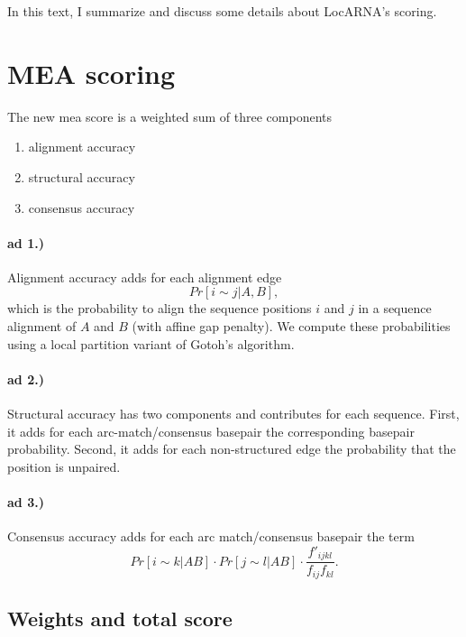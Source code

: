 \documentclass{article}
\begin{document}
In this text, I summarize and discuss some details about LocARNA's scoring.

\section{MEA scoring}
\label{sec:meascoring}

The new mea score is a weighted sum of three components

\begin{enumerate}
\item alignment accuracy
\item structural accuracy
\item consensus accuracy
\end{enumerate}

\paragraph{ad 1.)} Alignment accuracy adds for each alignment edge
\begin{displaymath}
  Pr[i\sim j|A,B],
\end{displaymath}
which is the probability to align the sequence positions $i$ and $j$ in a
sequence alignment of $A$ and $B$ (with affine gap penalty).  We compute these
probabilities using a local partition variant of Gotoh's algorithm.

\paragraph{ad 2.)} Structural accuracy has two components and contributes for each
sequence. First, it adds for each arc-match/consensus basepair the
corresponding basepair probability. Second, it adds for each non-structured
edge the probability that the position is unpaired.

\paragraph{ad 3.)} Consensus accuracy adds for each arc match/consensus basepair the term
\begin{displaymath}
  Pr[i\sim k|AB] \cdot Pr[j\sim l|AB] \cdot \frac{f'_{ijkl}}{f_{ij}f_{kl}}.
\end{displaymath}

\subsection{Weights and total score}
\end{document}
